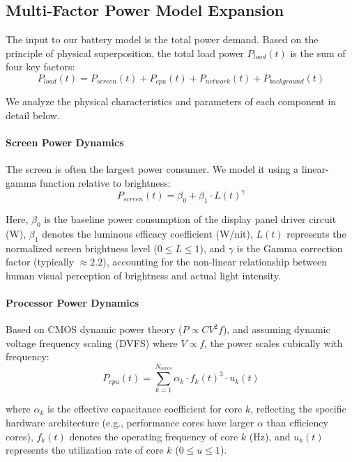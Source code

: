 \documentclass{mcmthesis}
\newcommand{\Pload}{P_{load}}
\begin{document}
\subsection{Multi-Factor Power Model Expansion}
The input to our battery model is the total power demand. Based on the principle of physical superposition, the total load power $\Pload(t)$ is the sum of four key factors:
\begin{equation} \label{eq:power_sum}
\Pload(t) = P_{screen}(t) + P_{cpu}(t) + P_{network}(t) + P_{background}(t)
\end{equation}

We analyze the physical characteristics and parameters of each component in detail below.

\paragraph{Screen Power Dynamics}
The screen is often the largest power consumer. We model it using a linear-gamma function relative to brightness:
\begin{equation}
P_{screen}(t) = \beta_0 + \beta_1 \cdot L(t)^\gamma
\end{equation}

Here, $\beta_0$ is the baseline power consumption of the display panel driver circuit (W), $\beta_1$ denotes the luminous efficacy coefficient (W/nit), $L(t)$ represents the normalized screen brightness level ($0 \le L \le 1$), and $\gamma$ is the Gamma correction factor (typically $\approx 2.2$), accounting for the non-linear relationship between human visual perception of brightness and actual light intensity.

\paragraph{Processor Power Dynamics}
Based on CMOS dynamic power theory ($P \propto C V^2 f$), and assuming dynamic voltage frequency scaling (DVFS) where $V \propto f$, the power scales cubically with frequency:
\begin{equation}
P_{cpu}(t) = \sum_{k=1}^{N_{cores}} \alpha_k \cdot f_k(t)^3 \cdot u_k(t)
\end{equation}

where $\alpha_k$ is the effective capacitance coefficient for core $k$, reflecting the specific hardware architecture (e.g., performance cores have larger $\alpha$ than efficiency cores), $f_k(t)$ denotes the operating frequency of core $k$ (Hz), and $u_k(t)$ represents the utilization rate of core $k$ ($0 \le u \le 1$).
\end{document}
